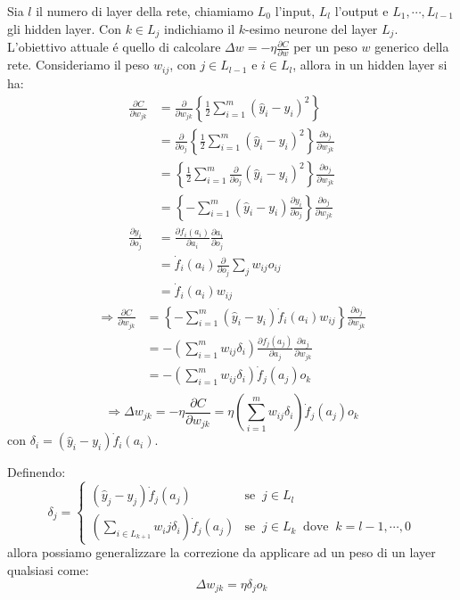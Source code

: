\documentclass[a4paper,10pt]{article}
\begin{document}
 Sia $l$ il numero di layer della rete, chiamiamo $L_0$ l'input, $L_l$ l'output e $L_1, \cdots, L_{l-1}$ gli hidden layer. Con $k \in L_j$ indichiamo il $k$-esimo neurone del layer $L_j$.
 L'obiettivo attuale \'e quello di calcolare $\Delta w = - \eta \frac{\partial C}{\partial w}$ per un peso $w$ generico della rete. Consideriamo il peso $w_{ij}$, con $j \in L_{l-1}$ e $i \in L_l$, allora in un hidden layer si ha:
 \begin{align}
  \frac{\partial C}{\partial w_{jk}} &= \frac{\partial}{\partial w_{jk}} \left \{ \frac{1}{2} \sum_{i=1}^m (\widehat{y}_i -y_i)^2 \right \} \\
  &= \frac{\partial}{\partial o_j} \left \{ \frac{1}{2} \sum_{i=1}^m (\widehat{y}_i - y_i)^2 \right \} \frac{\partial o_j}{\partial w_{jk}} \\
  &= \left \{ \frac{1}{2} \sum_{i=1}^m \frac{\partial}{\partial o_j} (\widehat{y}_i - y_i)^2 \right \} \frac{\partial o_j}{\partial w_{jk}} \\
  &= \left \{ - \sum_{i=1}^m (\widehat{y}_i - y_i) \frac{\partial y_i}{\partial o_j} \right \} \frac{\partial o_j}{\partial w_{jk}} \\
  \frac{\partial y_i}{\partial o_j} &= \frac{\partial f_i(a_i)}{\partial a_i} \frac{\partial a_i}{\partial o_j} \\
  &= \dot{f}_i(a_i) \frac{\partial}{\partial o_j} \sum_j w_{ij} o_{ij} \\
  &= \dot{f}_i(a_i) w_{ij} 
 \end{align}
 \begin{align}
  \Rightarrow \frac{\partial C}{\partial w_{jk}} &= \left \{ - \sum_{i=1}^m (\widehat{y}_i - y_i) \dot{f}_i(a_i) w_{ij} \right \} \frac{\partial o_j}{\partial w_{jk}} \\
  &= - \left( \sum_{i=1}^m w_{ij} \delta_i \right) \frac{\partial f_j(a_j)}{\partial a_j} \frac{\partial a_j}{\partial w_{jk}} \\
  &= - \left( \sum_{i=1}^m w_{ij} \delta_i \right) \dot{f}_j(a_j) o_k \\
 \end{align}
 \begin{equation}
  \Rightarrow \Delta w_{jk} = - \eta \frac{\partial C}{\partial w_{jk}} = \eta \left(\sum_{i=1}^m w_{ij} \delta_i \right) \dot{f}_j(a_j) o_k
 \end{equation}
 con $\delta_i = (\widehat{y}_i - y_i) \dot{f}_i(a_i)$.
 
 Definendo:
 \begin{equation}
  \delta_j = \begin{cases}
                       (\widehat{y}_j - y_j) \dot{f}_j(a_j) & \mbox{se} \;\; j \in L_l \\
                       \left( \sum_{i \in L_{k+1}} w_ij \delta_i \right) \dot{f}_j(a_j) & \mbox{se} \;\; j \in L_k \;\; \mbox{dove} \;\; k = l-1,\cdots,0
                      \end{cases}
 \end{equation}
 allora possiamo generalizzare la correzione da applicare ad un peso di un layer qualsiasi come:
 \begin{equation}
  \Delta w_{jk} = \eta \delta_j o_k
 \end{equation}
\end{document}
